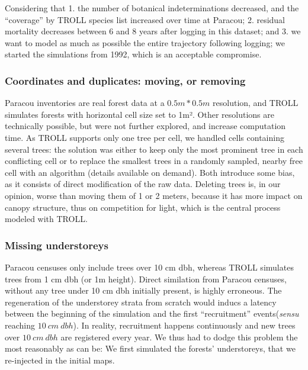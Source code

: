 \documentclass[12pt,]{article}
\theoremstyle{definition}
\theoremstyle{definition}
\theoremstyle{definition}
\theoremstyle{remark}
\begin{document}
Considering that 1. the number of botanical indeterminations decreased,
and the ``coverage'' by TROLL species list increased over time at
Paracou; 2. residual mortality decreases between 6 and 8 years after
logging in this dataset; and 3. we want to model as much as possible the
entire trajectory following logging; we started the simulations from
1992, which is an acceptable compromise.

\subsubsection{Coordinates and duplicates: moving, or
removing}\label{coordinates-and-duplicates-moving-or-removing}

Paracou inventories are real forest data at a \(0.5m*0.5m\) resolution,
and TROLL simulates forests with horizontal cell size set to 1m². Other
resolutions are technically possible, but were not further explored, and
increase computation time. As TROLL supports only one tree per cell, we
handled cells containing several trees: the solution was either to keep
only the most prominent tree in each conflicting cell or to replace the
smallest trees in a randomly sampled, nearby free cell with an algorithm
(details available on demand). Both introduce some bias, as it consists
of direct modification of the raw data. Deleting trees is, in our
opinion, worse than moving them of 1 or 2 meters, because it has more
impact on canopy structure, thus on competition for light, which is the
central process modeled with TROLL.

\subsubsection{Missing understoreys}\label{missing-understoreys}

Paracou censuses only include trees over 10 cm dbh, whereas TROLL
simulates trees from 1 cm dbh (or 1m height). Direct similation from
Paracou censuses, without any tree under 10 cm dbh initially present, is
highly erroneous. The regeneration of the understorey strata from
scratch would inducs a latency between the beginning of the simulation
and the first ``recruitment'' events(\emph{sensu} reaching
\(10\ cm\ dbh\)). In reality, recruitment happens continuously and new
trees over \(10\ cm\ dbh\) are registered every year. We thus had to
dodge this problem the most reasonably as can be: We first simulated the
forests' understoreys, that we re-injected in the initial maps.
\end{document}
